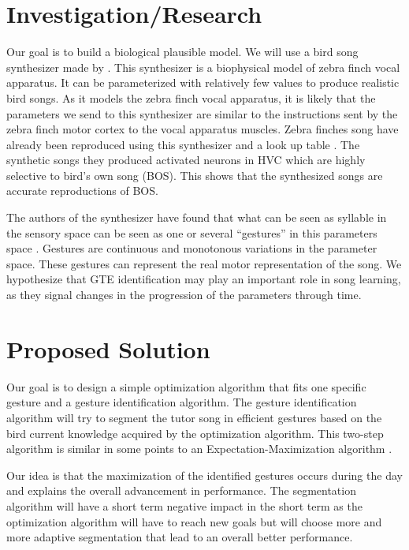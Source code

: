 \documentclass[a4paper]{article}
\begin{document}
\section*{Investigation/Research}

Our goal is to build a biological plausible model. We will use a bird song
synthesizer made by \textcite{boari_automatic_2015}. This synthesizer is a
biophysical model of zebra finch vocal apparatus. It can be parameterized with
relatively few values to produce realistic bird songs. As it models the zebra
finch vocal apparatus, it is likely that the parameters we send to this
synthesizer are similar to the instructions sent by the zebra finch motor cortex
to the vocal apparatus muscles. Zebra finches song have already been reproduced
using this synthesizer and a look up table \parencite{boari_automatic_2015}. The
synthetic songs they produced activated neurons in HVC which are highly
selective to bird's own song (BOS). This shows that the synthesized songs are
accurate reproductions of BOS.

The authors of the synthesizer have found that what can be seen as syllable in
the sensory space can be seen as one or several ``gestures'' in this parameters
space \parencite{amador_low_2014, boari_automatic_2015}. Gestures are continuous
and monotonous variations in the parameter space. These gestures can represent
the real motor representation of the song. We hypothesize that GTE
identification may play an important role in song learning, as they signal
changes in the progression of the parameters through time.

\section*{Proposed Solution}

Our goal is to design a simple optimization algorithm that fits one specific
gesture and a gesture identification algorithm. The gesture identification
algorithm will try to segment the tutor song in efficient gestures based on the
bird current knowledge acquired by the optimization algorithm. This two-step
algorithm is similar in some points to an Expectation-Maximization algorithm
\parencite{dempster_maximum_1977}.

Our idea is that the maximization of the identified gestures occurs during the
day and explains the overall advancement in performance. The segmentation
algorithm will have a short term negative impact in the short term as the
optimization algorithm will have to reach new goals but will choose more and
more adaptive segmentation that lead to an overall better performance.
\end{document}
